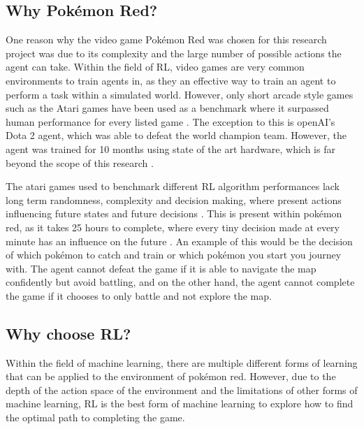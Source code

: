 \subsection{Why Pokémon Red?}

One reason why the video game Pokémon Red was chosen for this research project was due to its complexity and the large number of possible actions the agent can take. Within the field of RL, video games are very common environments to train agents in, as they an effective way to train an agent to perform a task within a simulated world. However, only short arcade style games such as the Atari games have been used as a benchmark where it surpassed human performance for every listed game \cite{brockman2016openai}. The exception to this is openAI's Dota 2 agent, which was able to defeat the world champion team. However, the agent was trained for 10 months using state of the art hardware, which is far beyond the scope of this research \cite{berner2019dota}.

The atari games used to benchmark different RL algorithm performances lack long term randomness, complexity and decision making, where present actions influencing future states and future decisions \cite{brockman2016openai}. This is present within pokémon red, as it takes 25 hours to complete, where every tiny decision made at every minute has an influence on the future \cite{howlongtobeat}. An example of this would be the decision of which pokémon to catch and train or which pokémon you start you journey with. The agent cannot defeat the game if it is able to navigate the map confidently but avoid battling, and on the other hand, the agent cannot complete the game if it chooses to only battle and not explore the map.

\subsection{Why choose RL?}

Within the field of machine learning, there are multiple different forms of learning that can be applied to the environment of pokémon red. However, due to the depth of the action space of the environment and the limitations of other forms of machine learning, RL is the best form of machine learning to explore how to find the optimal path to completing the game. 

